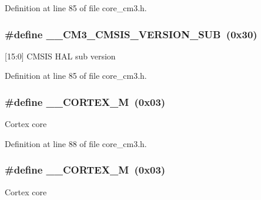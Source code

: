 Definition at line 85 of file core\+\_\+cm3.\+h.

\subsubsection[{\texorpdfstring{\+\_\+\+\_\+\+C\+M3\+\_\+\+C\+M\+S\+I\+S\+\_\+\+V\+E\+R\+S\+I\+O\+N\+\_\+\+S\+UB}{__CM3_CMSIS_VERSION_SUB}}]{\setlength{\rightskip}{0pt plus 5cm}\#define \+\_\+\+\_\+\+C\+M3\+\_\+\+C\+M\+S\+I\+S\+\_\+\+V\+E\+R\+S\+I\+O\+N\+\_\+\+S\+UB~(0x30)}\hypertarget{group___c_m_s_i_s___c_m3__core__definitions_ga9ff7a998d4b8b3c87bfaca6e78607950}{}\label{group___c_m_s_i_s___c_m3__core__definitions_ga9ff7a998d4b8b3c87bfaca6e78607950}
\mbox{[}15\+:0\mbox{]} C\+M\+S\+IS H\+AL sub version 

Definition at line 85 of file core\+\_\+cm3.\+h.

\subsubsection[{\texorpdfstring{\+\_\+\+\_\+\+C\+O\+R\+T\+E\+X\+\_\+M}{__CORTEX_M}}]{\setlength{\rightskip}{0pt plus 5cm}\#define \+\_\+\+\_\+\+C\+O\+R\+T\+E\+X\+\_\+M~(0x03)}\hypertarget{group___c_m_s_i_s___c_m3__core__definitions_ga63ea62503c88acab19fcf3d5743009e3}{}\label{group___c_m_s_i_s___c_m3__core__definitions_ga63ea62503c88acab19fcf3d5743009e3}
Cortex core 

Definition at line 88 of file core\+\_\+cm3.\+h.

\subsubsection[{\texorpdfstring{\+\_\+\+\_\+\+C\+O\+R\+T\+E\+X\+\_\+M}{__CORTEX_M}}]{\setlength{\rightskip}{0pt plus 5cm}\#define \+\_\+\+\_\+\+C\+O\+R\+T\+E\+X\+\_\+M~(0x03)}\hypertarget{group___c_m_s_i_s___c_m3__core__definitions_ga63ea62503c88acab19fcf3d5743009e3}{}\label{group___c_m_s_i_s___c_m3__core__definitions_ga63ea62503c88acab19fcf3d5743009e3}
Cortex core 

